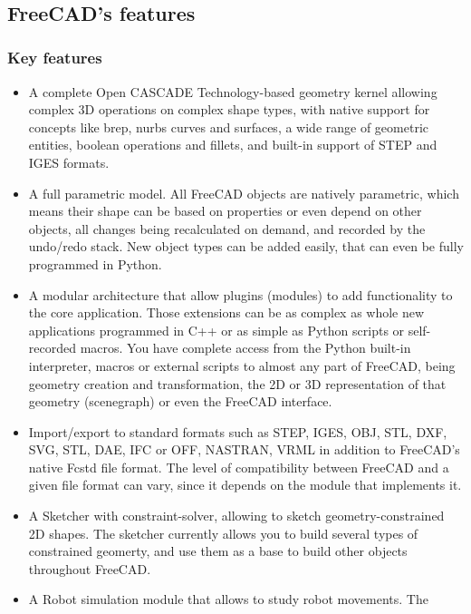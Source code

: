 \
\
\

\subsection{FreeCAD's features}
\subsubsection{Key features}
\begin{itemize}
\item A complete Open CASCADE Technology-based geometry kernel allowing 
complex 3D operations on complex shape types, with native support for 
concepts like brep, nurbs curves and surfaces, a wide range of geometric 
entities, boolean operations and fillets, and built-in support of STEP and 
IGES formats.
\item A full parametric model. All FreeCAD objects are natively parametric, 
which means their shape can be based on properties or even depend on other 
objects, all changes being recalculated on demand, and recorded by the 
undo/redo stack. New object types can be added easily, that can even be 
fully programmed in Python.
\item A modular architecture that allow plugins (modules) to add functionality
to the core application. Those extensions can be as complex as whole new
applications programmed in C++ or as simple as Python scripts or self-recorded
macros. You have complete access from the Python built-in interpreter,
macros or external scripts to almost any part of FreeCAD, being geometry 
creation and transformation, the 2D or 3D representation of that geometry 
(scenegraph) or even the FreeCAD interface.
\item Import/export to standard formats such as STEP, IGES, OBJ, STL, DXF, 
SVG, STL, DAE, IFC or OFF, NASTRAN, VRML in addition to FreeCAD's native 
Fcstd file format. The level of compatibility between FreeCAD and a given 
file format can vary, since it depends on the module that implements it.
\item A Sketcher with constraint-solver, allowing to sketch geometry-constrained 
2D shapes. The sketcher currently allows you to build several types of 
constrained geomerty, and use them as a base to build other objects throughout 
FreeCAD.
\item A Robot simulation module that allows to study robot movements. The 

\end{itemize}

